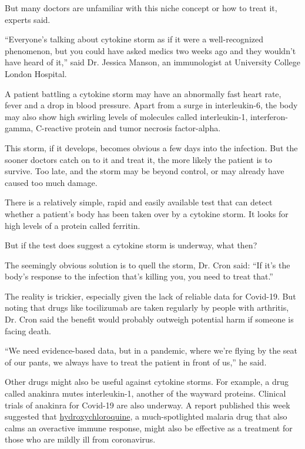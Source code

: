But many doctors are unfamiliar with this niche concept or how to treat
it, experts said.

``Everyone's talking about cytokine storm as if it were a
well-recognized phenomenon, but you could have asked medics two weeks
ago and they wouldn't have heard of it,'' said Dr. Jessica Manson, an
immunologist at University College London Hospital.

A patient battling a cytokine storm may have an abnormally fast heart
rate, fever and a drop in blood pressure. Apart from a surge in
interleukin-6, the body may also show high swirling levels of molecules
called interleukin-1, interferon-gamma, C-reactive protein and tumor
necrosis factor-alpha.

This storm, if it develops, becomes obvious a few days into the
infection. But the sooner doctors catch on to it and treat it, the more
likely the patient is to survive. Too late, and the storm may be beyond
control, or may already have caused too much damage.

There is a relatively simple, rapid and easily available test that can
detect whether a patient's body has been taken over by a cytokine storm.
It looks for high levels of a protein called ferritin.

But if the test does suggest a cytokine storm is underway, what then?

The seemingly obvious solution is to quell the storm, Dr. Cron said:
``If it's the body's response to the infection that's killing you, you
need to treat that.''

The reality is trickier, especially given the lack of reliable data for
Covid-19. But noting that drugs like tocilizumab are taken regularly by
people with arthritis, Dr. Cron said the benefit would probably outweigh
potential harm if someone is facing death.

``We need evidence-based data, but in a pandemic, where we're flying by
the seat of our pants, we always have to treat the patient in front of
us,'' he said.

Other drugs might also be useful against cytokine storms. For example, a
drug called anakinra mutes interleukin-1, another of the wayward
proteins. Clinical trials of anakinra for Covid-19 are also underway. A
report published this week suggested that
\href{https://www.nytimes3xbfgragh.onion/2020/04/01/health/hydroxychloroquine-coronavirus-malaria.html}{hydroxychloroquine},
a much-spotlighted malaria drug that also calms an overactive immune
response, might also be effective as a treatment for those who are
mildly ill from coronavirus.

